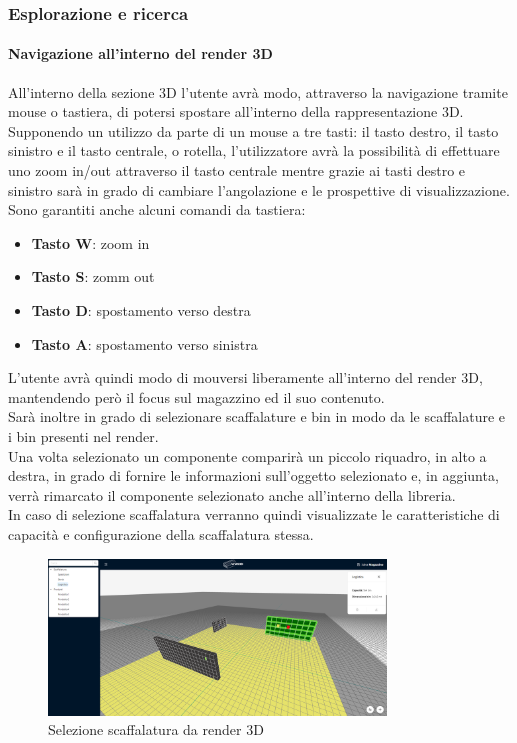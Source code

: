     
        \subsubsection{Esplorazione e ricerca}\label{sec:principale:esplorare}
            \paragraph{Navigazione all'interno del render 3D} \label{sec:principale:esplorare:navigare}
                All'interno della sezione 3D l'utente avrà modo, attraverso la navigazione tramite mouse o tastiera, di potersi spostare all'interno della rappresentazione 3D.
                Supponendo un utilizzo da parte di un mouse a tre tasti: il tasto destro, il tasto sinistro e il tasto centrale, o rotella, l'utilizzatore avrà la 
                possibilità di effettuare uno zoom in/out attraverso il tasto centrale mentre grazie ai tasti destro e sinistro sarà in grado di cambiare
                l'angolazione e le prospettive di visualizzazione. \\
                Sono garantiti anche alcuni comandi da tastiera: 
                \begin{itemize}
                    \item \textbf{Tasto W}: zoom in
                    \item \textbf{Tasto S}: zomm out
                    \item \textbf{Tasto D}: spostamento verso destra
                    \item \textbf{Tasto A}: spostamento verso sinistra
                \end{itemize}
                L'utente avrà quindi modo di mouversi liberamente all'interno del render 3D, mantendendo però il focus sul magazzino ed il suo contenuto. \\
                Sarà inoltre in grado di selezionare scaffalature e bin in modo da le scaffalature e i bin presenti nel render.\\
                Una volta selezionato un componente comparirà un piccolo riquadro, in alto a destra, in grado di fornire le informazioni sull'oggetto selezionato e, 
                in aggiunta, verrà rimarcato il componente selezionato anche all'interno della libreria. \\
                In caso di selezione scaffalatura verranno quindi visualizzate le caratteristiche di capacità e configurazione della scaffalatura stessa. 
                \begin{figure}[h!]
                    \centering
                    \includegraphics[width=0.8\textwidth]{images/selezione_scaffalatura.png}
                    \caption{Selezione scaffalatura da render 3D}
                \end{figure}
